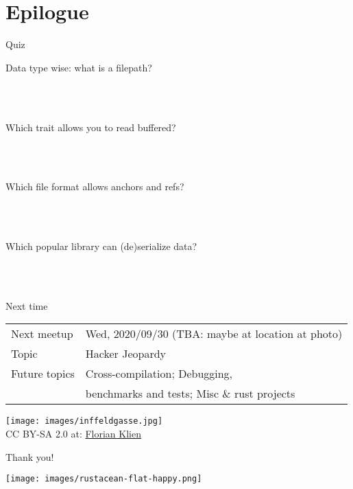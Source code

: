 \documentclass{beamer}
\begin{document}
\section{Epilogue}

\begin{frame}[fragile]{Quiz}
  \begin{description}
    \item[Data type wise: what is a filepath?] \hfill{} \\
      ~
    \item[Which trait allows you to read buffered?] \hfill{} \\
      ~
    \item[Which file format allows anchors and refs?] \hfill{} \\
      ~
    \item[Which popular library can (de)serialize data?] \hfill{} \\
      ~
  \end{description}
\end{frame}


\begin{frame}[fragile]{Next time}
  \begin{tabular}{ll}
    Next meetup   & Wed, 2020/09/30 (TBA: maybe at location at photo) \\
    Topic         & Hacker Jeopardy \\
    Future topics & Cross-compilation; Debugging, \\
                  & benchmarks and tests; Misc \& rust projects
  \end{tabular}
  \vfill{}
  \begin{center}
    \texttt{[image: images/inffeldgasse.jpg]} \\
    {CC BY-SA 2.0 at: \href{https://en.wikipedia.org/wiki/Graz_University_of_Technology#/media/File:TUG_Inffeldgasse_4.jpg}{Florian Klien}}
  \end{center}
\end{frame}

\begin{frame}[standout]
  Thank you!

  \texttt{[image: images/rustacean-flat-happy.png]}
\end{frame}
\end{document}
